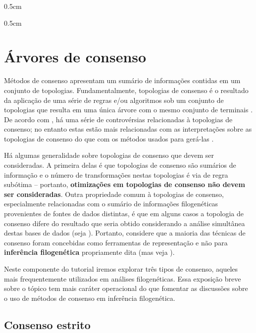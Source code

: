 \begin{refsection}
\begin {myindentpar}{0.5cm}
\begin{enumerate}[\itshape i.]
\begin {myindentpar}{0.5cm}
\begin{enumerate}[\itshape a.]
		\end{enumerate}
		\end{myindentpar}

\end{enumerate}
\end{myindentpar}

\section{Árvores de consenso}\label{tut6:consenso}

Métodos de consenso apresentam um sumário de informações contidas em um conjunto de topologias. Fundamentalmente, topologias de consenso é o resultado da aplicação de uma série de regras e/ou algoritmos sob um conjunto de topologias que resulta em uma única árvore com o mesmo conjunto de terminais \parencite{Bryant_2003}. De acordo com \textcite{Bryant_2003}, há uma série de controvérsias relacionadas à topologias de consenso; no entanto estas estão mais relacionadas com as interpretações sobre as topologias de consenso do que com os métodos usados para gerá-las \parencite[veja,][]{Barrett_et_al_1991}.

Há algumas generalidade sobre topologias de consenso que devem ser consideradas. A primeira delas é que topologias de consenso são sumários de informação e o número de transformações nestas topologias é via de regra subótima \parencite{Miyamoto_1985, Carpenter_1988} -- portanto, \textbf{otimizações em topologias de consenso não devem ser consideradas}. Outra propriedade comum à topologias de consenso, especialmente relacionadas com o sumário de informações filogenéticas provenientes de fontes de dados distintas, é que em alguns casos a topologia de consenso difere do resultado que seria obtido considerando a análise simultânea destas bases de dados (seja \textcite{Barrett_et_al_1991}). Portanto, considere que a maioria das técnicas de consenso foram concebidas como ferramentas de representação e não para \textbf{inferência filogenética} propriamente dita (mas veja \textcite{Holder_et_al_2008}).
	
Neste componente do tutorial iremos explorar três tipos de consenso, aqueles mais frequentemente utilizados em análises filogenéticas. Essa exposição breve sobre o tópico tem mais caráter operacional do que fomentar as discussões sobre o uso de métodos de consenso em inferência filogenética.

\subsection{Consenso estrito}\label{tut6:consenso:strict}


\end{refsection}

